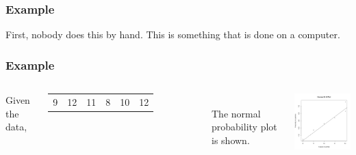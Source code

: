 \begin{frame}
  \frametitle{Example}

  First, nobody does this by hand. {\color{red}This is something that
    is done on a computer.}  

  
  
\end{frame}

\begin{frame}
  \frametitle{Example}


  \begin{columns}

    Given the data, \\
    \begin{tabular}{llllll}
      9 & 12 & 11 & 8 & 10 & 12
    \end{tabular} \\
    The normal probability plot is shown.


  \includegraphics[width=5cm]{img/normalQQEx2}

  \end{columns}
  
  
\end{frame}


